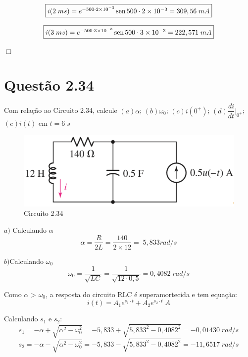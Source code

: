 \documentclass[
	12pt,				%
	oneside,			%
	a4paper,			%
	english,			%
	french,				%
	spanish,			%
	brazil				%
	]{abntex2}
\DeclareMathOperator{\sen}{sen}
\begin{document}
\begin{equation}
    \fbox{$i(2\;ms)=e^{-500\cdot2\times10^{-3}}\sen{500\cdot2\times10^{-3}}=309,56\;mA$}
\end{equation}
    
\begin{equation}
    \fbox{$i(3\;ms)=e^{-500\cdot3\times10^{-3}}\sen{500\cdot3\times10^{-3}}=222,571\;mA$}
\end{equation}


\begin{flushright}
    $\Box$
\end{flushright}
\newpage


\section*{Questão 2.34}
Com relação ao Circuito 2.34, calcule $(a) \alpha$; $(b)\omega_0$; $(c)i(0^+)$; $(d)\dfrac{di}{dt}\Bigg|_{0^+}^{}$; $(e)i(t)$ em $t=6\;s$
\begin{figure}[htb]
	\centering
	\includegraphics[scale=0.5]{2-34.PNG}
	\caption{Circuito 2.34}
\end{figure}

$a)$ Calculando $\alpha$
$$\alpha={\dfrac{R}{2L}}={\dfrac{140}{2\times12}}= \;5,833rad/s$$

$b)$Calculando $\omega_0$
$$\omega_0={\dfrac{1}{\sqrt{LC}}}={\dfrac{1}{\sqrt{12\cdot0,5}}}=0,4082\;rad/s$$

Como $\alpha$ > $\omega_0$, a resposta do circuito RLC é superamortecida e tem equação:
$$i(t)=A_1e^{s_1\cdot t}+A_2e^{s_2\cdot t}\;A$$

Calculando $s_1$ e $s_2$:
$$s_1=-\alpha+\sqrt{\alpha^2-\omega_0^2}=-5,833+\sqrt{5,833^2-0,4082^2}=-0,01430\;rad/s$$
$$s_2=-\alpha-\sqrt{\alpha^2-\omega_0^2}=-5,833-\sqrt{5,833^2-0,4082^2}=-11,6517\;rad/s$$
\end{document}
